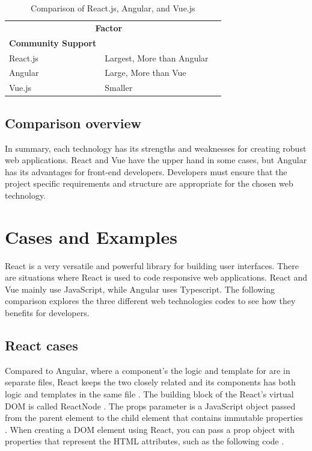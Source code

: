 \documentclass[10pt,journal,compsoc]{IEEEtran}
\begin{document}
\begin{table}[ht]
    \centering
    \begin{tabular}{llr}
        \hline
        \multicolumn{2}{c}{\textbf{Factor}} \\
        \cline{1-2}
        \textbf{Community Support} & \\
        React.js & Largest, More than Angular \cite{cincovic2020comparison}\\
        Angular & Large, More than Vue  \cite{cincovic2020comparison}\\
        Vue.js & Smaller \cite{cincovic2020comparison}\\
        \hline
    \end{tabular}
    \caption{Comparison of React.js, Angular, and Vue.js}
    \label{tab:comparison}
\end{table}

\subsection{Comparison overview}
In summary, each technology has its strengths and weaknesses for creating robust web applications. React and Vue have the upper hand in some cases, but Angular has its advantages for front-end developers. Developers must ensure that the project specific requirements and structure are appropriate for the chosen web technology.

\section{Cases and Examples}
React is a very versatile and powerful library for building user interfaces. There are situations where React is used to code responsive web applications. React and Vue mainly use JavaScript, while Angular uses Typescript. The following comparison explores the three different web technologies codes to see how they benefits for developers.

\subsection{React cases}
Compared to Angular, where a component's the logic and template for are in separate files, React keeps the two closely related and its components has both logic and templates in the same file \cite{cincovic2020comparison}. The building block of the React's virtual DOM is called ReactNode \cite{fedosejev2015react}. The props parameter is a JavaScript object passed from the parent element to the child element that contains immutable properties \cite{fedosejev2015react}. When creating a DOM element using React, you can pass a prop object with properties that represent the HTML attributes, such as the following code \cite{fedosejev2015react}.
\end{document}
